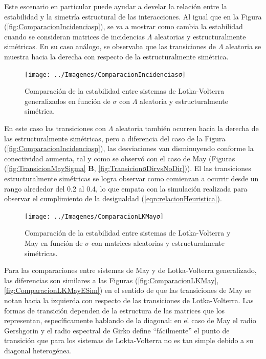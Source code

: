 Este escenario en particular puede ayudar a develar la relación entre la estabilidad y la simetría estructural de las interacciones. Al igual que en la Figura (\ref{fig:ComparacionIncidenciasp}), se va a mostrar como cambia la estabilidad cuando se consideran matrices de incidencias $\Lambda$ aleatorias y estructuralmente simétricas. En su caso análogo, se observaba que las transiciones de $\Lambda$ aleatoria se muestra hacia la derecha con respecto de la estructuralmente simétrica. 
\newpage
\begin{figure}[h!]
	\centering
	\texttt{[image: ../Imagenes/ComparacionIncidenciasσ]}
	\caption{Comparación de la estabilidad entre sistemas de Lotka-Volterra generalizados en función de $\sigma$ con $\Lambda$ aleatoria y estructuralmente simétrica.}
	\label{fig:ComparacionIncidenciasσ}
\end{figure}

En este caso las transiciones con $\Lambda$ aleatoria también ocurren hacia la derecha de las estructuralmente simétricas, pero a diferencia del caso de la Figura (\ref{fig:ComparacionIncidenciasp}), las desviaciones van disminuyendo conforme la conectividad aumenta, tal y como se observó con el caso de May (Figuras (\ref{fig:TransicionMaySigma} \textbf{B}, \ref{fig:TransicionσDirvsNoDir})). El las transiciones estructuralmente simétricas se logra observar como comienzan a ocurrir desde un rango alrededor del 0.2 al 0.4, lo que empata con la simulación realizada para observar el cumplimiento de la desigualdad (\ref{eqn:relacionHeuristica}). 
\begin{figure}[h!]
	\centering
	\texttt{[image: ../Imagenes/ComparacionLKMayσ]}
	\caption{Comparación de la estabilidad entre sistemas de Lotka-Volterra y May en función de $\sigma$ con matrices aleatorias y estructuralmente simétricas.}
	\label{fig:ComparacionLKMayσ}
\end{figure}
\newpage
Para las comparaciones entre sistemas de May y de Lotka-Volterra generalizado, las diferencias son similares a las Figuras (\ref{fig:ComparacionLKMay}, \ref{fig:ComparacionLKMayESim}) en el sentido de que las transiciones de May se notan hacia la izquierda con respecto de las transiciones de Lotka-Volterra. Las formas de transición dependen de la estructura de las matrices que los representan, específicamente hablando de la diagonal: en el caso de May el radio Gershgorin \cite{GershgorinTheorem} y el radio espectral de Girko \cite{girko1985circular} define ``fácilmente'' el punto de transición que para los sistemas de Lokta-Volterra no es tan simple debido a su diagonal heterogénea. 

